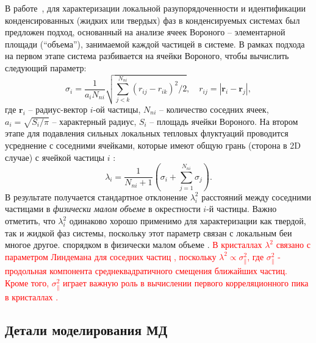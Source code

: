 В работе~\cite{10.1021/acs.jpcc.7b09317}, для характеризации локальной разупорядоченности и идентификации конденсированных (жидких или твердых) фаз в конденсируемых системах был предложен подход, основанный на анализе ячеек Вороного -- элементарной площади (``объема''), занимаемой каждой частицей в системе.
В рамках подхода на первом этапе система разбивается на ячейки Вороного, чтобы вычислить следующий параметр:
\begin{equation}
\label{SSMF-eq1}
\sigma_{i} =\frac{1}{a_i N_{ni}}\sqrt{\sum_{j<k}^{N_{ni}}{(r_{ij}-r_{ik})^2}/2}, \quad r_{ij}=|\mathbf{r}_i-\mathbf{r}_j|,
\end{equation}
где $\mathbf{r}_i$ -- радиус-вектор $i$-ой частицы, $N_{ni}$ -- количество соседних ячеек, $a_i = \sqrt{S_i/\pi}$ -- характерный радиус, $S_i$ -- площадь ячейки Вороного.
На втором этапе для подавления сильных локальных тепловых флуктуаций проводится усреднение с соседними ячейками, которые имеют общую грань (сторона в 2D случае) с ячейкой частицы $i$ \cite{10.1021/acs.jpcc.7b09317}:
\begin{equation}
\label{SSMF-eq2}
\lambda_{i} = \frac{1}{N_{ni}+1}\left(\sigma_{i}+\sum_{j=1}^{N_{ni}}{\sigma_{j}}\right).
\end{equation}
В результате получается стандартное отклонение $\lambda_i^2$ расстояний между соседними частицами в \emph{физически малом объеме} в окрестности $i$-й частицы.
Важно отметить, что $\lambda_i^2$ одинаково хорошо применимо для характеризации как твердой, так и жидкой фаз системы, поскольку этот параметр связан с локальным беи многое другое. спорядком в физически малом объеме \cite{10.1021/acs.jpcc.7b09317}.
\textcolor{red}{В кристаллах $\lambda^2$ связано с параметром Линдемана для соседних частиц \cite{10.1016/0375-9601(85)90617-6}, поскольку $\lambda^2 \propto \sigma_\|^2$, где $\sigma_\|^2$ - продольная компонента среднеквадратичного смещения ближайших частиц.
Кроме того, $\sigma_\|^2$ играет важную роль в вычислении первого корреляционного пика в кристаллах \cite{10.1063/1.4869863, 10.1063/1.4926945, 10.1088/0953-8984/28/23/235401, 10.1039/c7sm02429k, 10.1063/1.5116176}.}



\subsection{Детали моделирования МД}
\label{SSMF-AppC}


